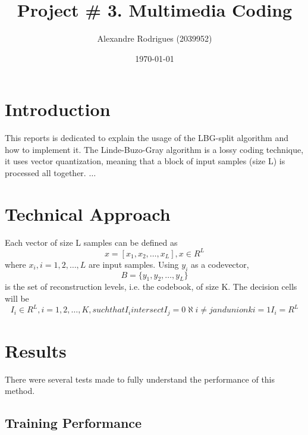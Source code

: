 \documentclass[a4paper, 11pt]{article}
\begin{document}
	
	\title{Project \# 3. Multimedia Coding }
	\author{{\small Alexandre Rodrigues (2039952)}}
	\date{\today}
	\maketitle
	
	\section{Introduction}
		This reports is dedicated to explain the usage of the LBG-split algorithm and how to implement it.
		The Linde-Buzo-Gray algorithm is a lossy coding technique, it uses vector quantization, meaning that a block of input samples (size L) is processed all together.
		$\ldots$
	
	\section{Technical Approach}
		Each vector of size L samples can be defined as
		\begin{equation}
			x = [x_1, x_2, \ldots, x_L], x \in R^L
		\end{equation}
		where $x_i, i=1,2,\ldots,L$ are input samples. 
		Using $y_i $ as a codevector, 
		\begin{equation}
			B =  \{y_1, y_2, \ldots, y_L\}
		\end{equation} 
		is the set of reconstruction levels, i.e. the codebook, of size K.
		The decision cells will be
		\begin{equation}
			I_i \in R^L, i = 1, 2, \ldots, K, such that I_i intersect I_j = 0 \aleph i \neq j and union k i=1 I_i = R^L
		\end{equation} 
		
	
	\section{Results}
		There were several tests made to fully understand the performance of this method.
		
		\subsection{Training Performance}
		
\end{document}

